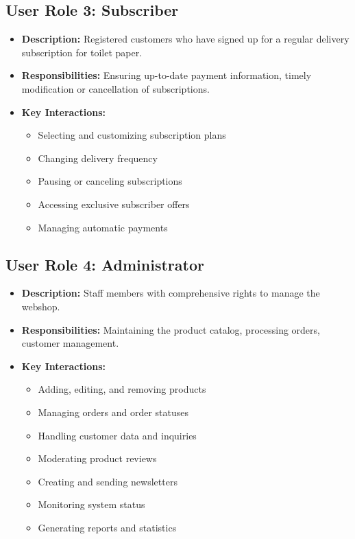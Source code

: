 \documentclass[a4paper,11pt]{article}
\begin{document}
\subsection{User Role 3: Subscriber}
\begin{itemize}
    \item \textbf{Description:} Registered customers who have signed up for a regular delivery subscription for toilet paper.
    \item \textbf{Responsibilities:} Ensuring up-to-date payment information, timely modification or cancellation of subscriptions.
    \item \textbf{Key Interactions:}
    \begin{itemize}
        \item Selecting and customizing subscription plans
        \item Changing delivery frequency
        \item Pausing or canceling subscriptions
        \item Accessing exclusive subscriber offers
        \item Managing automatic payments
    \end{itemize}
\end{itemize}

\subsection{User Role 4: Administrator}
\begin{itemize}
    \item \textbf{Description:} Staff members with comprehensive rights to manage the webshop.
    \item \textbf{Responsibilities:} Maintaining the product catalog, processing orders, customer management.
    \item \textbf{Key Interactions:}
    \begin{itemize}
        \item Adding, editing, and removing products
        \item Managing orders and order statuses
        \item Handling customer data and inquiries
        \item Moderating product reviews
        \item Creating and sending newsletters
        \item Monitoring system status
        \item Generating reports and statistics
    \end{itemize}
\end{itemize}
\end{document}
